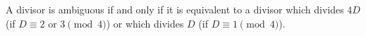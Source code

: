 A divisor is ambiguous if and only if it is equivalent to a divisor which divides $4D$ (if $D \equiv 2$ or $3 \pmod{4}$) or which divides $D$ (if $D \equiv 1 \pmod{4}$).
